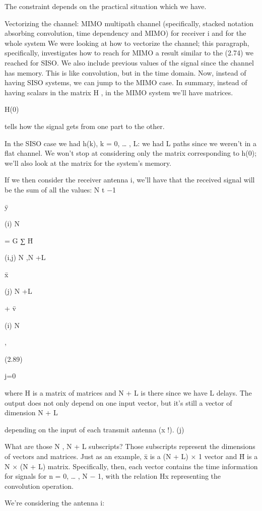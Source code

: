 {The constraint depends on the practical situation which we have.

Vectorizing the channel: MIMO multipath channel
(specifically, stacked notation absorbing convolution,
time dependency and MIMO) for receiver i and for the whole system We were looking at how to vectorize the channel; this paragraph, specifically,
investigates how to reach for MIMO a result similar to the (2.74) we reached for SISO.
We also include previous values of the signal since the channel has memory.
This is like convolution, but in the time domain.
Now, instead of having SISO systems, we can jump to the MIMO case. In summary,
instead of having scalars in the matrix H , in the MIMO system we'll have matrices.

H(0)

tells how the signal gets from one part to the other.

In the SISO case we had h(k), k = 0, … , L: we had L paths since we weren't in a flat channel.
We won't stop at considering only the matrix corresponding to h(0); we'll also look at the matrix for the system's memory.

If we then consider the receiver antenna i, we'll have that the received signal will be the sum of all the values:
N t −1

ȳ

(i)
N

= \sqrt G ∑ H̄

(i,j)
N ,N +L

x̄

(j)
N +L

+ v̄

(i)
N

,

(2.89)

j=0

where H is a matrix of matrices and N + L is there since we have L delays.
The output does not only depend on one input vector, but it's still a vector of dimension N + L

depending on the input of each transmit antenna (x !).
(j)

​What are those N , N + L subscripts?
Those subscripts represent the dimensions of vectors and matrices.
Just as an example, x̄ is a (N + L) × 1 vector and H̄ is a N × (N + L) matrix.
Specifically, then, each vector contains the time information for signals for n = 0, … , N − 1, with the relation Hx representing the convolution operation.

We're considering the antenna i:

}
